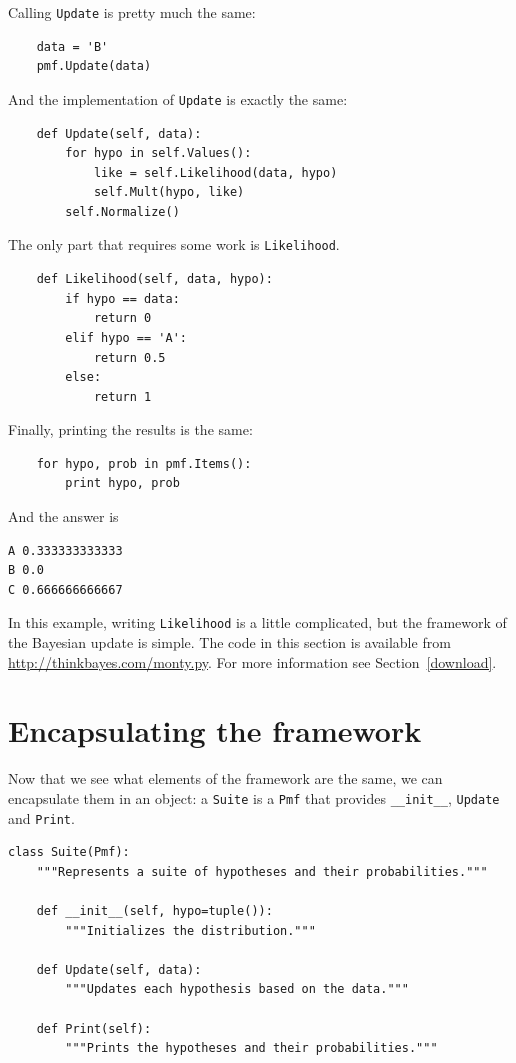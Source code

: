 \documentclass[12pt]{book}
\begin{document}
Calling \verb"Update" is pretty much the same:

\begin{verbatim}
    data = 'B'
    pmf.Update(data)
\end{verbatim}

And the implementation of \verb"Update" is exactly the same:

\begin{verbatim}
    def Update(self, data):
        for hypo in self.Values():
            like = self.Likelihood(data, hypo)
            self.Mult(hypo, like)
        self.Normalize()
\end{verbatim}

The only part that requires some work is \verb"Likelihood".

\begin{verbatim}
    def Likelihood(self, data, hypo):
        if hypo == data:
            return 0
        elif hypo == 'A':
            return 0.5
        else:
            return 1
\end{verbatim}

Finally, printing the results is the same:

\begin{verbatim}
    for hypo, prob in pmf.Items():
        print hypo, prob
\end{verbatim}

And the answer is

\begin{verbatim}
A 0.333333333333
B 0.0
C 0.666666666667
\end{verbatim}

In this example, writing \verb"Likelihood" is a little complicated,
but the framework of the Bayesian update is simple.  The code in
this section is available from \url{http://thinkbayes.com/monty.py}.
  For more information
see Section~\ref{download}.

\section{Encapsulating the framework}

Now that we see what elements of the framework are the same, we
can encapsulate them in an object: a \verb"Suite" is a \verb"Pmf"
that provides \verb"__init__", \verb"Update" and \verb"Print".

\begin{verbatim}
class Suite(Pmf):
    """Represents a suite of hypotheses and their probabilities."""

    def __init__(self, hypo=tuple()):
        """Initializes the distribution."""

    def Update(self, data):
        """Updates each hypothesis based on the data."""

    def Print(self):
        """Prints the hypotheses and their probabilities."""
\end{verbatim}
\end{document}
